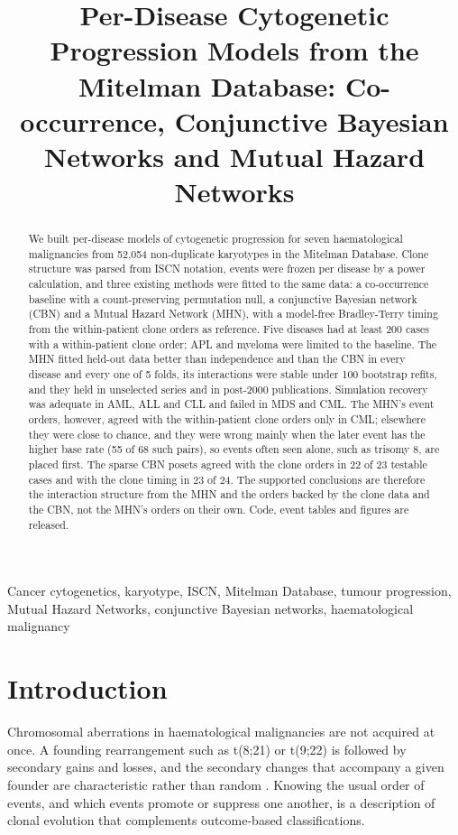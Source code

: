 \documentclass[conference]{IEEEtran}
\begin{document}
\title{Per-Disease Cytogenetic Progression Models from the Mitelman Database: Co-occurrence, Conjunctive Bayesian Networks and Mutual Hazard Networks}
\author{}
\maketitle
\begin{abstract}
We built per-disease models of cytogenetic progression for seven haematological malignancies from 52,054 non-duplicate karyotypes in the Mitelman Database. Clone structure was parsed from ISCN notation, events were frozen per disease by a power calculation, and three existing methods were fitted to the same data: a co-occurrence baseline with a count-preserving permutation null, a conjunctive Bayesian network (CBN) and a Mutual Hazard Network (MHN), with a model-free Bradley-Terry timing from the within-patient clone orders as reference. Five diseases had at least 200 cases with a within-patient clone order; APL and myeloma were limited to the baseline. The MHN fitted held-out data better than independence and than the CBN in every disease and every one of 5 folds, its interactions were stable under 100 bootstrap refits, and they held in unselected series and in post-2000 publications. Simulation recovery was adequate in AML, ALL and CLL and failed in MDS and CML. The MHN's event orders, however, agreed with the within-patient clone orders only in CML; elsewhere they were close to chance, and they were wrong mainly when the later event has the higher base rate (55 of 68 such pairs), so events often seen alone, such as trisomy 8, are placed first. The sparse CBN posets agreed with the clone orders in 22 of 23 testable cases and with the clone timing in 23 of 24. The supported conclusions are therefore the interaction structure from the MHN and the orders backed by the clone data and the CBN, not the MHN's orders on their own. Code, event tables and figures are released.
\end{abstract}
\begin{IEEEkeywords}
Cancer cytogenetics, karyotype, ISCN, Mitelman Database, tumour progression, Mutual Hazard Networks, conjunctive Bayesian networks, haematological malignancy
\end{IEEEkeywords}

\section{Introduction}
Chromosomal aberrations in haematological malignancies are not acquired at once. A founding rearrangement such as t(8;21) or t(9;22) is followed by secondary gains and losses, and the secondary changes that accompany a given founder are characteristic rather than random \cite{johansson2002,grimwade2010}. Knowing the usual order of events, and which events promote or suppress one another, is a description of clonal evolution that complements outcome-based classifications.
\end{document}
